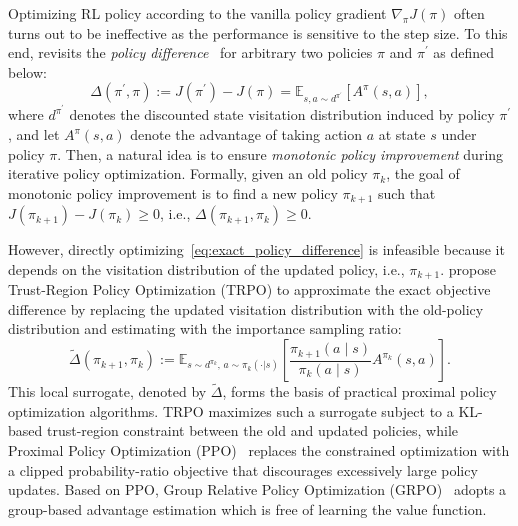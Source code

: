 Optimizing RL policy according to the vanilla policy gradient $\nabla_{\pi}J(\pi)$ often turns out to be ineffective as the performance is sensitive to the step size. To this end, \citet{SchulmanLAJM15TRPO} revisits the \textit{policy difference}~\citep{KakadeL02CPI} for arbitrary two policies $\pi$ and $\pi^{\prime}$ as defined below:
\begin{equation}
    \Delta(\pi^{\prime},\pi)
    :=
    J(\pi^{\prime}) - J(\pi)
    =
    \mathbb{E}_{s,a \sim d^{\pi^{\prime}}}
    \left[
        A^{\pi}(s,a)
    \right],
    \label{eq:exact_policy_difference}
\end{equation}
where $d^{\pi^{\prime}}$ denotes the discounted state visitation distribution induced by policy $\pi^{\prime}$, and let $A^{\pi}(s,a)$ denote the advantage of taking action $a$ at state $s$ under policy $\pi$. 
Then, a natural idea is to ensure \textit{monotonic policy improvement} during iterative policy optimization.
Formally, given an old policy $\pi_k$, the goal of monotonic policy improvement is to find a new policy $\pi_{k+1}$ such that $J(\pi_{k+1})-J(\pi_k)\geq 0$, i.e., $\Delta(\pi_{k+1}, \pi_k) \ge 0$.



However, directly optimizing~\autoref{eq:exact_policy_difference} is infeasible because it depends on the visitation distribution of the updated policy, i.e., $\pi_{k+1}$. 
\citet{SchulmanLAJM15TRPO} propose Trust-Region Policy Optimization (TRPO) to approximate the exact objective difference by replacing the updated visitation distribution with the old-policy distribution and estimating with the importance sampling ratio:
\begin{equation}
    \widetilde{\Delta}(\pi_{k+1},\pi_k)
    :=
    \mathbb{E}_{s\sim d^{\pi_k},\,a\sim\pi_k(\cdot|s)}
    \left[
        \frac{\pi_{k+1}(a\mid s)}{\pi_k(a\mid s)}
        A^{\pi_k}(s,a)
    \right].
    \label{eq:ratio_surrogate}
\end{equation}
This local surrogate, denoted by $\tilde{\Delta}$, forms the basis of practical proximal policy optimization algorithms. 
TRPO maximizes such a surrogate subject to a KL-based trust-region constraint between the old and updated policies, while Proximal Policy Optimization (PPO)~\citep{SchulmanWDRK17PPO} replaces the constrained optimization with a clipped probability-ratio objective that discourages excessively large policy updates. Based on PPO, Group Relative Policy Optimization (GRPO)~\citep{Shao24GRPO} adopts a group-based advantage estimation which is free of learning the value function.
\vspace{-0.2cm}
